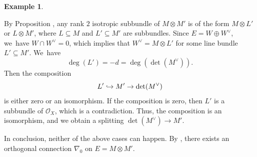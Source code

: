 \documentclass[JEP,XML,SOM,Unicode,published]{cedram}
\newcommand\hto{\mathrel{\lhook\joinrel\to}}
\theoremstyle{plain}
\theoremstyle{definition}
\newtheorem{examp}[thm]{Example}
\begin{document}
\begin{examp}
\begin{itemize}
\begin{enumerate}
By Proposition \cite[Prop.\,4.5]{CH23}, any rank $2$ isotropic subbundle of $M \otimes M'$ is of the form $M \otimes L'$ or $L \otimes M'$, where $L \subseteq M$ and $L' \subseteq M'$ are subbundles. Since $E=W \oplus W^{\vee}$, we~have $W \cap W^{\vee} = 0$, which implies that $W^\vee = M \otimes L'$ for some line bundle $L' \subseteq M'$. We~have
\[
\deg(L') = -d = \deg(\det(M^{\vee})).
\]
Then the composition
\[
L' \hto M' \to \det(M^{\vee})
\]
is either zero or an isomorphism. If the composition is zero, then $L'$ is a subbundle of $\mathcal{O}_X$, which is a contradiction. Thus, the composition is an isomorphism, and we obtain a splitting $\det(M^{\vee}) \to M'$.
\end{enumerate}
\end{itemize}
In conclusion, neither of the above cases can happen. By \cite[Th.\,4.2]{BMW11}, there exists an orthogonal connection $\nabla_0$ on $E = M \otimes M'$.
\end{examp}
\end{document}
